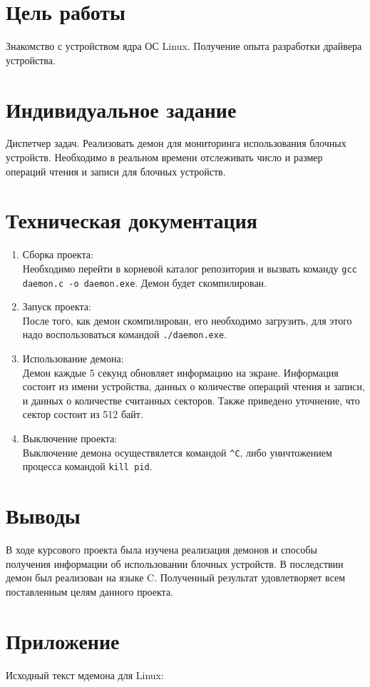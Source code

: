 \documentclass[a4paper,12pt]{article}
\newcommand{\InlineCode}[1]{\colorbox{Gray!25}
{\lstinline[identifierstyle=\color{Red!80}]{#1}}}
\begin{document}
\section{Цель работы}
Знакомство с устройством ядра ОС Linux.
Получение опыта разработки драйвера устройства.


\section{Индивидуальное задание}
Диспетчер задач. Реализовать демон для мониторинга использования
блочных устройств. Необходимо в реальном времени отслеживать число 
и размер операций чтения и записи для блочных устройств.


\section{Техническая документация}
\begin{enumerate}
	\item Сборка проекта: \\
		Необходимо перейти в корневой каталог репозитория и вызвать команду
		\InlineCode{gcc daemon.c -o daemon.exe}. Демон будет скомпилирован.
	\item Запуск проекта: \\
		После того, как демон скомпилирован, его необходимо загрузить,
		для этого надо воспользоваться командой \InlineCode{./daemon.exe}.
	\item Использование демона: \\
		Демон каждые 5 секунд обновляет информацию на экране.
		Информация состоит из имени устройства, данных о количестве операций
		чтения и записи, и данных о количестве считанных секторов.
		Также приведено уточнение, что сектор состоит из 512 байт.
	\item Выключение проекта: \\
		Выключение демона осуществялется командой \InlineCode{^C}, 
		либо уничтожением процесса командой  \InlineCode{kill pid}.
\end{enumerate}


\section{Выводы}
В ходе курсового проекта была изучена реализация демонов и способы
получения информации об использовании блочных устройств. 
В последствии демон был реализован на языке C. Полученный
результат удовлетворяет всем поставленным целям данного проекта.


\newpage
\section{Приложение}
Исходный текст мдемона для Linux:

\end{document}

